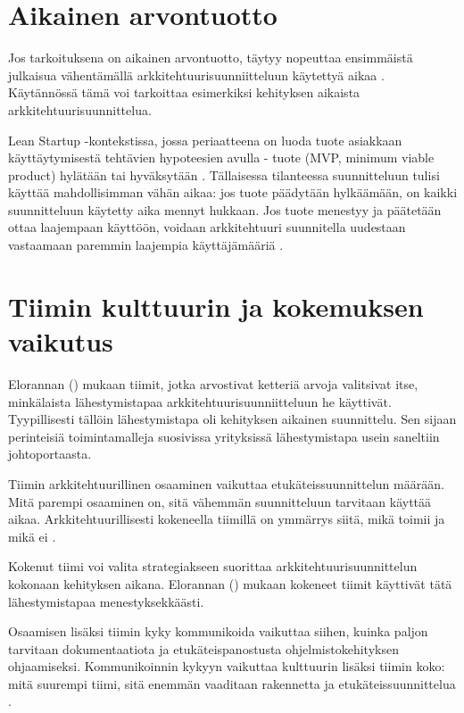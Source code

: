 \section{Aikainen arvontuotto}

Jos tarkoituksena on aikainen arvontuotto, täytyy nopeuttaa ensimmäistä julkaisua vähentämällä arkkitehtuurisuunniitteluun käytettyä aikaa \citep{waterman_how_2015}. Käytännössä tämä voi tarkoittaa esimerkiksi kehityksen aikaista arkkitehtuurisuunnittelua.

Lean Startup -kontekstissa, jossa periaatteena on luoda tuote  asiakkaan käyttäytymisestä tehtävien hypoteesien avulla - tuote (MVP, minimum viable product) hylätään tai hyväksytään \citep{reis2011lean}. Tällaisessa tilanteessa suunnitteluun tulisi käyttää mahdollisimman vähän aikaa: jos tuote päädytään hylkäämään, on kaikki suunnitteluun käytetty aika mennyt hukkaan. Jos tuote menestyy ja päätetään ottaa laajempaan käyttöön, voidaan arkkitehtuuri suunnitella uudestaan vastaamaan paremmin laajempia käyttäjämääriä \citep{reis2011lean}.

\section{Tiimin kulttuurin ja kokemuksen vaikutus}

Elorannan (\citeyear{eloranta2015techniques}) mukaan tiimit, jotka arvostivat ketteriä arvoja valitsivat itse, minkälaista lähestymistapaa arkkitehtuurisuunniitteluun he käyttivät. Tyypillisesti tällöin lähestymistapa oli kehityksen aikainen suunnittelu. Sen sijaan perinteisiä toimintamalleja suosivissa yrityksissä lähestymistapa usein saneltiin johtoportaasta. 

Tiimin arkkitehtuurillinen osaaminen vaikuttaa etukäteissuunnittelun määrään. Mitä parempi osaaminen on, sitä vähemmän suunnitteluun tarvitaan käyttää aikaa. Arkkitehtuurillisesti kokeneella tiimillä on ymmärrys siitä, mikä toimii ja mikä ei \citep{waterman_how_2015}.

Kokenut tiimi voi valita strategiakseen suorittaa arkkitehtuurisuunnittelun kokonaan kehityksen aikana. Elorannan (\citeyear{eloranta2015techniques}) mukaan kokeneet tiimit käyttivät tätä lähestymistapaa menestyksekkäästi.

Osaamisen lisäksi tiimin kyky kommunikoida vaikuttaa siihen, kuinka paljon tarvitaan dokumentaatiota ja etukäteispanostusta ohjelmistokehityksen ohjaamiseksi. Kommunikoinnin kykyyn vaikuttaa kulttuurin lisäksi tiimin koko: mitä suurempi tiimi, sitä enemmän vaaditaan rakennetta ja etukäteissuunnittelua \citep{waterman_how_2015}.

